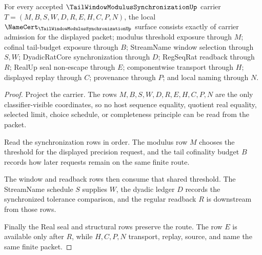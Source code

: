 \begin{theorem}
\label{thm:tail-window-modulus-synchronization-obligations}
For every accepted $\TailWindowModulusSynchronizationUp$ carrier $T=(M,B,S,W,D,R,E,H,C,P,N)$, the local $\NameCert_{\TailWindowModulusSynchronizationUp}$ surface consists exactly of carrier admission for the displayed packet; modulus threshold exposure through $M$; cofinal tail-budget exposure through $B$; StreamName window selection through $S,W$; DyadicRatCore synchronization through $D$; RegSeqRat readback through $R$; RealUp seal non-escape through $E$; componentwise transport through $H$; displayed replay through $C$; provenance through $P$; and local naming through $N$.
\end{theorem}
\begin{proof}
Project the carrier. The rows $M,B,S,W,D,R,E,H,C,P,N$ are the only classifier-visible coordinates, so no host sequence equality, quotient real equality, selected limit, choice schedule, or completeness principle can be read from the packet.

Read the synchronization rows in order. The modulus row $M$ chooses the threshold for the displayed precision request, and the tail cofinality budget $B$ records how later requests remain on the same finite route.

The window and readback rows then consume that shared threshold. The StreamName schedule $S$ supplies $W$, the dyadic ledger $D$ records the synchronized tolerance comparison, and the regular readback $R$ is downstream from those rows.

Finally the Real seal and structural rows preserve the route. The row $E$ is available only after $R$, while $H,C,P,N$ transport, replay, source, and name the same finite packet.
\end{proof}

